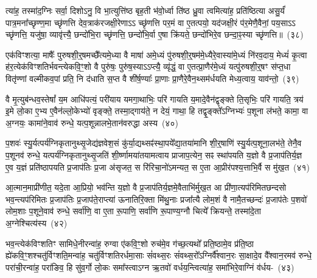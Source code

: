 त्या॑ह॒ तस्मा॑द॒ग्निः सर्वा॒ दिशो\-ऽनु॒ वि भा॒त्युत्ति॑ष्ठ बृह॒ती भ॑वो॒र्ध्वा ति॑ष्ठ ध्रु॒वा त्वमित्या॑ह॒ प्रति॑ष्ठित्या असु॒र्यं॑ पात्र॒\-मना᳚च्छृण्ण॒मा च्छृ॑णत्ति देव॒त्राक॑रजक्षी॒रेणा\-ऽऽ च्छृ॑णत्ति पर॒मं वा ए॒तत्पयो॒ यद॑जक्षी॒रं प॑र॒मेणै॒वैनां॒ पय॒सा\-ऽऽ च्छृ॑णत्ति॒ यजु॑षा॒ व्यावृ॑त्त्यै॒ छन्दो॑भि॒रा च्छृ॑णत्ति॒ छन्दो॑भि॒र्वा ए॒षा क्रि॑यते॒ छन्दो॑भिरे॒व छन्दा॒ꣴ॒स्या च्छृ॑णत्ति॥~(३८)\ip

{\anuvakamend[{आ॒ह॒ दे॒वानां॒ वै पत्नीः᳚ पृणै॒षा षट्च॑}]}

एक॑विꣳशत्या॒ माषैः᳚ पुरुषशी॒र्॒\mbox{}षमच्छै᳚त्यमे॒ध्या वै माषा॑ अमे॒ध्यं पु॑रुषशी॒र्॒\mbox{}षम॑\-मे॒ध्यै\-रे॒वास्या॑मे॒ध्यं नि॑रव॒दाय॒ मेध्यं॑ कृ॒त्वा ह॑र॒त्येक॑विꣳशतिर्भवन्त्येकवि॒ꣳ॒शो वै पुरु॑षः॒ पुरु॑ष॒स्या\-ऽऽप्त्यै॒ व्यृ॑द्धं॒ वा ए॒तत्प्रा॒णैर॑मे॒ध्यं यत्पु॑रुषशी॒र्॒\mbox{}षꣳ स॑प्त॒धा वितृ॑ण्णां वल्मीकव॒पां प्रति॒ नि द॑धाति स॒प्त वै शी॑र्\mbox{}ष॒ण्याः᳚ प्रा॒णाः प्रा॒णैरे॒वैन॒थ्सम॑र्धयति मेध्य॒त्वाय॒ याव॑न्तो॒~(३९)\ip

वै मृ॒त्युब॑न्धव॒स्तेषां᳚ य॒म आधि॑पत्यं॒ परी॑याय यमगा॒थाभिः॒ परि॑ गायति य॒मादे॒वैन॑द्वृङ्क्ते ति॒सृभिः॒ परि॑ गायति॒ त्रय॑ इ॒मे लो॒का ए॒भ्य ए॒वैन॑ल्लो॒केभ्यो॑ वृङ्क्ते॒ तस्मा॒द्गाय॑ते॒ न देयं॒ गाथा॒ हि तद्वृ॒ङ्क्ते᳚\-ऽग्निभ्यः॑ प॒शूना ल॑भते॒ कामा॒ वा अ॒ग्नयः॒ कामा॑ने॒वाव॑ रुन्धे॒ यत्प॒शून्नालभे॒तान॑वरुद्धा अस्य~(४०)\ip

प॒शवः॑ स्यु॒र्यत्पर्य॑ग्निकृतानुथ्सृ॒जेद्य॑ज्ञवेश॒सं कु॑र्या॒द्यथ्सꣴ॑स्था॒पये᳚द्या॒तया॑मानि शी॒र्॒\mbox{}षाणि॑ स्यु॒र्यत्प॒शूना॒लभ॑ते॒ तेनै॒व प॒शूनव॑ रुन्धे॒ यत्पर्य॑ग्निकृतानुथ्सृ॒जति॑ शी॒र्ष्णामया॑तयामत्वाय प्राजाप॒त्येन॒ सꣴ स्था॑पयति य॒ज्ञो वै प्र॒जा\-प॑तिर्य॒ज्ञ ए॒व य॒ज्ञं प्रति॑\-ष्ठापयति प्र॒जा\-प॑तिः प्र॒जा अ॑सृजत॒ स रि॑रिचा॒नो॑\-ऽमन्यत॒ स ए॒ता आ॒प्रीर॑पश्य॒त्ताभि॒र्वै स मु॑ख॒त~(४१)\ip

आ॒त्मान॒माप्री॑णीत॒ यदे॒ता आ॒प्रियो॒ भव॑न्ति य॒ज्ञो वै प्र॒जा\-प॑तिर्य॒ज्ञमे॒वैताभि॑र्मुख॒त आ प्री॑णा॒त्यप॑रिमितछन्दसो भव॒न्त्यप॑रिमितः प्र॒जा\-प॑तिः प्र॒जा\-प॑ते॒राप्त्या॑ ऊनातिरि॒क्ता मि॑थु॒नाः प्रजा᳚त्यै लोम॒शं वै नामै॒तच्छन्दः॑ प्र॒जा\-प॑तेः प॒शवो॑ लोम॒शाः प॒शूने॒वाव॑ रुन्धे॒ सर्वा॑णि॒ वा ए॒ता रू॒पाणि॒ सर्वा॑णि रू॒पाण्य॒ग्नौ चित्ये᳚ क्रियन्ते॒ तस्मा॑दे॒ता अ॒ग्नेश्चित्य॑स्य~(४२)\ip

भव॒न्त्येक॑विꣳशतिꣳ सामिधे॒नीरन्वा॑ह॒ रुग्वा ए॑कवि॒ꣳ॒शो रुच॑मे॒व ग॑च्छ॒त्यथो᳚ प्रति॒ष्ठामे॒व प्र॑ति॒ष्ठा ह्ये॑कवि॒ꣳ॒शश्चतु॑र्विꣳशति॒मन्वा॑ह॒ चतु॑र्विꣳशतिरर्धमा॒साः सं॑वथ्स॒रः सं॑वथ्स॒रो᳚\-ऽग्निर्वै᳚श्वान॒रः सा॒क्षादे॒व वै᳚श्वान॒रमव॑ रुन्धे॒ परा॑ची॒रन्वा॑ह॒ परा॑ङिव॒ हि सु॑व॒र्गो लो॒कः समा᳚स्त्वा\-ऽग्न ऋ॒तवो॑ वर्धय॒न्त्वित्या॑ह॒ समा॑भिरे॒वाग्निं व॑र्धय-~(४३)\ip

